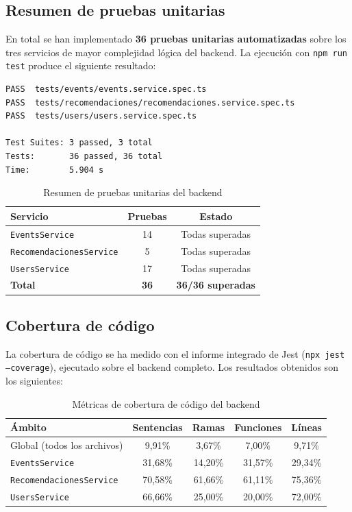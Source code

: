 \subsection{Resumen de pruebas unitarias}

En total se han implementado \textbf{36 pruebas unitarias automatizadas} sobre los tres servicios de mayor complejidad lógica del backend. La ejecución con \texttt{npm run test} produce el siguiente resultado:

\begin{verbatim}
PASS  tests/events/events.service.spec.ts
PASS  tests/recomendaciones/recomendaciones.service.spec.ts
PASS  tests/users/users.service.spec.ts

Test Suites: 3 passed, 3 total
Tests:       36 passed, 36 total
Time:        5.904 s
\end{verbatim}

\begin{table}[H]
\centering
\begin{tabular}{|l|c|c|}
\hline
\textbf{Servicio} & \textbf{Pruebas} & \textbf{Estado} \\
\hline
\texttt{EventsService} & 14 & Todas superadas \\
\hline
\texttt{RecomendacionesService} & 5 & Todas superadas \\
\hline
\texttt{UsersService} & 17 & Todas superadas \\
\hline
\textbf{Total} & \textbf{36} & \textbf{36/36 superadas} \\
\hline
\end{tabular}
\caption{Resumen de pruebas unitarias del backend}
\end{table}

\subsection{Cobertura de código}

La cobertura de código se ha medido con el informe integrado de Jest (\texttt{npx jest --coverage}), ejecutado sobre el backend completo. Los resultados obtenidos son los siguientes:

\begin{table}[H]
\centering
\caption{Métricas de cobertura de código del backend}
\label{tab:cobertura}
\begin{tabular}{|l|c|c|c|c|}
\hline
\textbf{Ámbito} & \textbf{Sentencias} & \textbf{Ramas} & \textbf{Funciones} & \textbf{Líneas} \\
\hline
Global (todos los archivos) & 9,91\% & 3,67\% & 7,00\% & 9,71\% \\
\hline
\texttt{EventsService} & 31,68\% & 14,20\% & 31,57\% & 29,34\% \\
\hline
\texttt{RecomendacionesService} & 70,58\% & 61,66\% & 61,11\% & 75,36\% \\
\hline
\texttt{UsersService} & 66,66\% & 25,00\% & 20,00\% & 72,00\% \\
\hline
\end{tabular}
\end{table}

